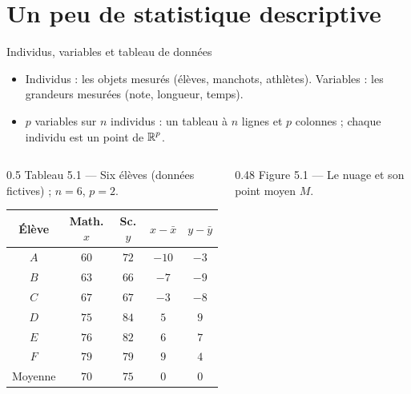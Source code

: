 \section{Un peu de statistique descriptive}

\begin{frame}{Individus, variables et tableau de données}
  \begin{itemize}
    \item Individus : les objets mesurés (élèves, manchots, athlètes).
      Variables : les grandeurs mesurées (note, longueur, temps).
    \item $p$ variables sur $n$ individus : un tableau à $n$ lignes et $p$
      colonnes ; chaque individu est un point de $\operatorname{\mathbb{R}}^p$.
  \end{itemize}
  \begin{columns}[c]
    \begin{column}{0.5\textwidth}
      \scriptsize Tableau 5.1 --- Six élèves (données fictives) ; $n=6$,
      $p=2$.
      \begin{center}
        \scriptsize
        \begin{tabular}{ccccc}
          \toprule
          Élève & Math. $x$ & Sc. $y$ & $x-\bar x$ & $y-\bar y$ \\
          \midrule
          $A$ & $60$ & $72$ & $-10$ & $-3$ \\
          $B$ & $63$ & $66$ & $-7$ & $-9$ \\
          $C$ & $67$ & $67$ & $-3$ & $-8$ \\
          $D$ & $75$ & $84$ & $5$ & $9$ \\
          $E$ & $76$ & $82$ & $6$ & $7$ \\
          $F$ & $79$ & $79$ & $9$ & $4$ \\
          \midrule
          Moyenne & $70$ & $75$ & $0$ & $0$ \\
          \bottomrule
        \end{tabular}
      \end{center}
    \end{column}
    \begin{column}{0.48\textwidth}
      \scriptsize Figure 5.1 --- Le nuage et son point moyen $M$.
    \end{column}
  \end{columns}
\end{frame}

